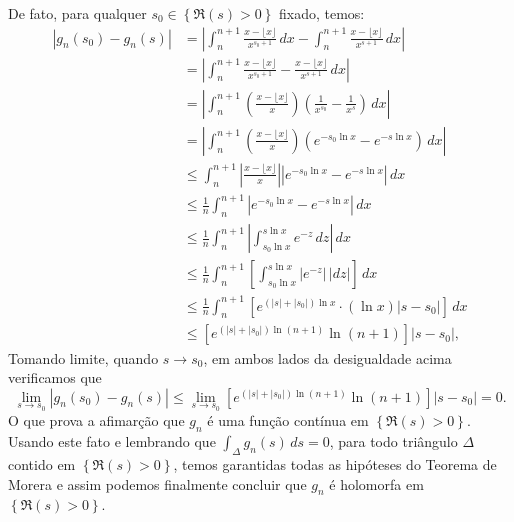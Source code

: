 \begin{exemplo}
De fato, para qualquer $s_0\in \left\{ \Re(s) > 0 \right\}$ fixado, temos:
\begin{align*}
    |g_n(s_0)-g_n(s)|
    &=
    \left|  
    \int_n^{n+1} \frac{x - \lfloor x \rfloor}{x^{s_0+1}} \, dx
    -
    \int_n^{n+1} \frac{x - \lfloor x \rfloor}{x^{s+1}} \, dx
    \right|
    \\[0.3cm]
    &=
    \left| 
        \int_n^{n+1} 
        \frac{x - \lfloor x \rfloor}{x^{s_0+1}} 
        - 
        \frac{x - \lfloor x \rfloor}{x^{s+1}}
        \, dx
    \right|
   \\[0.3cm]
    &= 
    \left| 
        \int_n^{n+1}
        \left(\frac{x - \lfloor x \rfloor}{x}\right)
        \left(\frac{1}{x^{s_0}} - \frac{1}{x^{s}}\right)
        \, dx
    \right|
   \\[0.3cm]
    &= 
    \left| 
        \int_n^{n+1}
        \left(\frac{x - \lfloor x \rfloor}{x}\right)
        \left(e^{-s_0\ln x} - e^{-s\ln x}\right)
        \, dx
    \right|
   \\[0.3cm]
    &\leqslant  
    \int_n^{n+1}
    \left|\frac{x - \lfloor x \rfloor}{x}\right|
    \left|e^{-s_0\ln x} - e^{-s\ln x}\right|
    \, dx
   \\[0.3cm]
    &\leqslant 
    \frac{1}{n}
    \int_n^{n+1}
    |e^{-s_0\ln x} - e^{-s\ln x}|
    \, dx
   \\[0.3cm]
    &\leqslant 
    \frac{1}{n}
    \int_n^{n+1}
    \left| \int_{s_0\ln x}^{s\ln x}e^{-z} \, dz\right|
    \, dx
   \\[0.3cm]
    &\leqslant 
    \frac{1}{n}
    \int_n^{n+1}
    \left[\int_{s_0\ln x}^{s\ln x}|e^{-z}| \, |dz|\right]
    \, dx
   \\[0.3cm]
    &\leqslant 
    \frac{1}{n}
    \int_n^{n+1}
    \left[
    e^{(|s|+|s_0|)\ln x}
    \cdot (\ln x)|s-s_0|
    \right]
    \, dx
   \\[0.3cm]
    &\leqslant 
    \left[
    e^{(|s|+|s_0|)\ln(n+1)}
    \ln(n+1)
    \right]
    |s-s_0|,
\end{align*}
Tomando limite, quando $s\to s_0$, em ambos lados da desigualdade acima verificamos que
\[
\lim_{s\to s_0}
|g_n(s_0)-g_n(s)|
\leqslant 
\lim_{s\to s_0}
\left[e^{(|s|+|s_0|)\ln(n+1)}\ln(n+1)\right]|s-s_0|
=
0.
\]
O que prova a afimarção que $g_n$ é uma função contínua em 
$\left\{ \Re(s) > 0 \right\}$. 
Usando este fato e lembrando que $\int_{\Delta} g_n(s) \, ds=0$,
para todo triângulo $\Delta$ contido em $\left\{ \Re(s) > 0 \right\}$,
temos garantidas todas as hipóteses do Teorema de Morera e assim podemos finalmente concluir que $g_n$ é holomorfa em $\left\{ \Re(s) > 0 \right\}$.




\end{exemplo}
